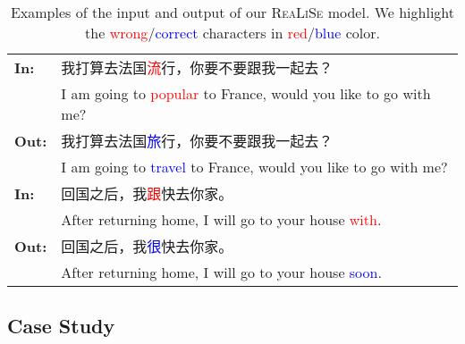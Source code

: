 \documentclass[11pt,a4paper]{article}
\newcommand\model{\textsc{ReaLiSe}}
\begin{document}
\begin{CJK*}{UTF8}{gbsn}

\begin{table}[t]
\small
\centering

\begin{tabular}{p{0.3cm}p{6.3cm}}
\toprule

\textbf{In:} & 我打算去法国\textcolor{red}{流}行，你要不要跟我一起去？ \\
& I am going to \textcolor{red}{popular} to France, would you like to go with me? \\ 
\midrule
\textbf{Out:} & 我打算去法国\textcolor{blue}{旅}行，你要不要跟我一起去？ \\
& I am going to \textcolor{blue}{travel} to France, would you like to go with me? \\ \midrule \midrule
  
\textbf{In:} & 回国之后，我\textcolor{red}{跟}快去你家。 \\
& After returning home, I will go to your house \textcolor{red}{with}. \\ \midrule
\textbf{Out:} & 回国之后，我\textcolor{blue}{很}快去你家。 \\
& After returning home, I will go to your house \textcolor{blue}{soon}. \\ \bottomrule





\end{tabular}

\caption{Examples of the input and output of our \model{} model. We highlight the \textcolor{red}{wrong}/\textcolor{blue}{correct} characters in \textcolor{red}{red}/\textcolor{blue}{blue} color. 
}
\label{tab:case}
\end{table}

\end{CJK*} 

\subsection{Case Study}
\end{document}
